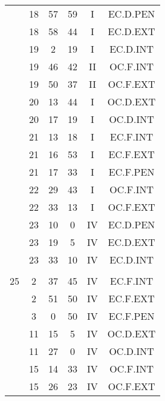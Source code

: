 \documentclass[12pt, a4paper]{article}
\begin{document}
\begin{multicols}{3}
{\begin{tabular}{c c c c c c}
	 	 	 	 & 18 & 57 & 59 & I & EC.D.PEN\\%
	 	 	 	 & 18 & 58 & 44 & I & EC.D.EXT\\%
	 	 	 	 & 19 & 2 & 19 & I & EC.D.INT\\%
	 	 	 	 & 19 & 46 & 42 & II & OC.F.INT\\%
	 	 	 	 & 19 & 50 & 37 & II & OC.F.EXT\\%
	 	 	 	 & 20 & 13 & 44 & I & OC.D.EXT\\%
	 	 	 	 & 20 & 17 & 19 & I & OC.D.INT\\%
	 	 	 	 & 21 & 13 & 18 & I & EC.F.INT\\%
	 	 	 	 & 21 & 16 & 53 & I & EC.F.EXT\\%
	 	 	 	 & 21 & 17 & 33 & I & EC.F.PEN\\%
	 	 	 	 & 22 & 29 & 43 & I & OC.F.INT\\%
	 	 	 	 & 22 & 33 & 13 & I & OC.F.EXT\\%
	 	 	 	 & 23 & 10 & 0 & IV & EC.D.PEN\\%
	 	 	 	 & 23 & 19 & 5 & IV & EC.D.EXT\\%
	 	 	 	 & 23 & 33 & 10 & IV & EC.D.INT\\%
	 	 	 	 & & & & & \\%
	 	 	 	25 & 2 & 37 & 45 & IV & EC.F.INT\\%
	 	 	 	 & 2 & 51 & 50 & IV & EC.F.EXT\\%
	 	 	 	 & 3 & 0 & 50 & IV & EC.F.PEN\\%
	 	 	 	 & 11 & 15 & 5 & IV & OC.D.EXT\\%
	 	 	 	 & 11 & 27 & 0 & IV & OC.D.INT\\%
	 	 	 	 & 15 & 14 & 33 & IV & OC.F.INT\\%
	 	 	 	 & 15 & 26 & 23 & IV & OC.F.EXT\\%

\end{tabular}}
\end{multicols}
\end{document}
